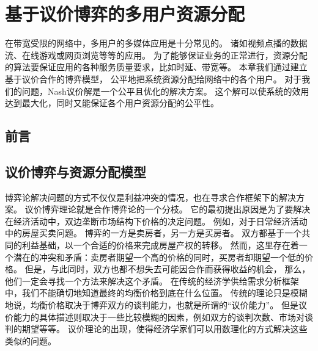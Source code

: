 \graphicspath{ {../body/nash_bargaining_figures/} }
\chapter{基于议价博弈的多用户资源分配}
在带宽受限的网络中，多用户的多媒体应用是十分常见的。
诸如视频点播的数据流、在线游戏或网页浏览等等的应用。
为了能够保证业务的正常进行，资源分配的算法要保证应用的各种服务质量要求，比如时延、带宽等。
本章我们通过建立基于议价合作的博弈模型，
公平地把系统资源分配给网络中的各个用户。
对于我们的问题，Nash议价解是一个公平且优化的解决方案。
这个解可以使系统的效用达到最大化，同时又能保证各个用户资源分配的公平性。

\section{前言}

\section{议价博弈与资源分配模型}
博弈论解决问题的方式不仅仅是利益冲突的情况，也在寻求合作框架下的解决方案。
议价博弈理论就是合作博弈论的一个分枝。
它的最初提出原因是为了要解决在经济活动中，双边垄断市场结构下价格的决定问题。
例如，对于日常经济活动中的房屋买卖问题。
博弈的一方是卖房者，另一方是买房者。
双方都基于一个共同的利益基础，以一个合适的价格来完成房屋产权的转移。
然而，这里存在着一个潜在的冲突和矛盾：卖房者期望一个高的价格的同时，买房者却期望一个低的价格。
但是，与此同时，双方也都不想失去可能因合作而获得收益的机会，
那么，他们一定会寻找一个方法来解决这个矛盾。
在传统的经济学供给需求分析框架中，我们不能确切地知道最终的均衡价格到底在什么位置。
传统的理论只是模糊地说，均衡价格取决于博弈双方的谈判能力，也就是所谓的“议价能力”。
但是议价能力的具体描述则取决于一些比较模糊的因素，例如双方的谈判次数、市场对谈判的期望等等。
议价理论的出现，使得经济学家们可以用数理化的方式解决这些类似的问题。

